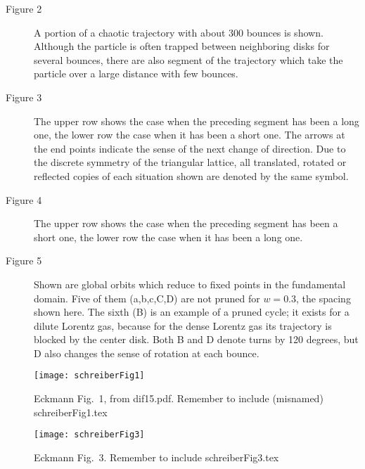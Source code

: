 \begin{description}

\item[Figure 2]
 A portion of a chaotic trajectory with about 300 bounces is shown.
Although the particle is often trapped between neighboring disks
for several bounces, there are also
segment of the trajectory
which take the particle over a large distance with few bounces.

\item[Figure 3]
The upper row shows the case when the preceding
segment has been a long one,
the lower row the case when it has been a short one.
The arrows at the end points
indicate the sense of the next change of direction.
Due to the discrete symmetry of the triangular lattice,
all translated, rotated or reflected copies of each
situation shown are denoted by the same symbol.

\item[Figure 4]
The upper row shows the case when the preceding
segment has been a short one,
the lower row the case when it has been a long one.

 \item[Figure 5]
Shown are global orbits which reduce to fixed points in the fundamental
domain. Five of them (a,b,c,C,D) are not pruned for $w=0.3$,
the spacing shown here. The sixth (B) is an example of a pruned
cycle; it exists for a dilute Lorentz gas, because
for the dense Lorentz gas its trajectory is blocked by the center
disk. Both B and D denote turns by 120 degrees, but
D also changes the sense of rotation at each bounce.
\end{description}

\begin{figure}
\begin{center}
\texttt{[image: schreiberFig1]}
\end{center}
\caption{
Eckmann Fig.~1, from dif15.pdf. Remember to include
(misnamed) schreiberFig1.tex
    }
\label{schreiberFig1}
\end{figure}

\begin{figure}
\begin{center}
\texttt{[image: schreiberFig3]}
\end{center}
\caption{
Eckmann Fig.~3. Remember to include
schreiberFig3.tex
    }
\label{schreiberFig3}
\end{figure}


